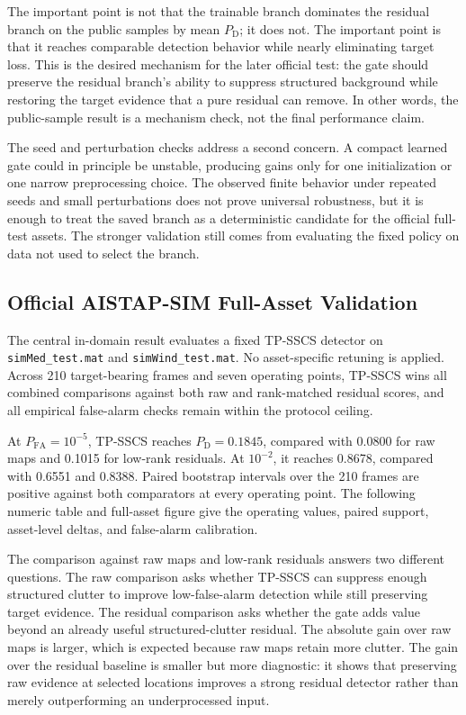 \documentclass[journal]{IEEEtran}
\begin{document}
The important point is not that the trainable branch dominates the residual branch on the public samples by mean $P_{\mathrm{D}}$; it does not. The important point is that it reaches comparable detection behavior while nearly eliminating target loss. This is the desired mechanism for the later official test: the gate should preserve the residual branch's ability to suppress structured background while restoring the target evidence that a pure residual can remove. In other words, the public-sample result is a mechanism check, not the final performance claim.

The seed and perturbation checks address a second concern. A compact learned gate could in principle be unstable, producing gains only for one initialization or one narrow preprocessing choice. The observed finite behavior under repeated seeds and small perturbations does not prove universal robustness, but it is enough to treat the saved branch as a deterministic candidate for the official full-test assets. The stronger validation still comes from evaluating the fixed policy on data not used to select the branch.

\subsection{Official AISTAP-SIM Full-Asset Validation}

The central in-domain result evaluates a fixed TP-SSCS detector on \texttt{simMed\_test.mat} and \texttt{simWind\_test.mat}. No asset-specific retuning is applied. Across 210 target-bearing frames and seven operating points, TP-SSCS wins all combined comparisons against both raw and rank-matched residual scores, and all empirical false-alarm checks remain within the protocol ceiling.

At $P_{\mathrm{FA}}=10^{-5}$, TP-SSCS reaches $P_{\mathrm{D}}=0.1845$, compared with 0.0800 for raw maps and 0.1015 for low-rank residuals. At $10^{-2}$, it reaches 0.8678, compared with 0.6551 and 0.8388. Paired bootstrap intervals over the 210 frames are positive against both comparators at every operating point. The following numeric table and full-asset figure give the operating values, paired support, asset-level deltas, and false-alarm calibration.

The comparison against raw maps and low-rank residuals answers two different questions. The raw comparison asks whether TP-SSCS can suppress enough structured clutter to improve low-false-alarm detection while still preserving target evidence. The residual comparison asks whether the gate adds value beyond an already useful structured-clutter residual. The absolute gain over raw maps is larger, which is expected because raw maps retain more clutter. The gain over the residual baseline is smaller but more diagnostic: it shows that preserving raw evidence at selected locations improves a strong residual detector rather than merely outperforming an underprocessed input.
\end{document}

